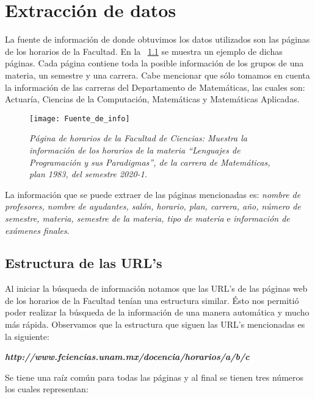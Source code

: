 \chapter{Extracción de datos}

La fuente de información de donde obtuvimos los datos utilizados son las páginas de los horarios de la Facultad. En la \figurename{~\ref{pagFC}} se muestra un ejemplo de dichas páginas. Cada página contiene toda la posible información de los grupos de una materia, un semestre y una carrera. Cabe mencionar que sólo tomamos en cuenta la información de las carreras del Departamento de Matemáticas, las cuales son: Actuaría, Ciencias de la Computación, Matemáticas y Matemáticas Aplicadas.

\begin{figure}[H]
\centering
\texttt{[image: Fuente\_de\_info]} %
\caption[\textit{Página de horarios de la Facultad de Ciencias}]{\textit{Página de horarios de la Facultad de Ciencias: Muestra la información de los horarios de la materia ``Lenguajes de Programación y sus Paradigmas'', de la carrera de Matemáticas, plan 1983, del semestre 2020-1.}}\label{pagFC}
\end{figure}

La información que se puede extraer de las páginas mencionadas es: \textit{nombre de profesores, nombre de ayudantes, salón, horario, plan, carrera, año, número de semestre, materia, semestre de la materia, tipo de materia} e \textit{información de exámenes finales}.


\section{Estructura de las URL's}

Al iniciar la búsqueda de información notamos que las URL's de las páginas web de los horarios de la Facultad tenían una estructura similar. Ésto nos permitió poder realizar la búsqueda de la información de una manera automática y mucho más rápida. Observamos que la estructura que siguen las URL's mencionadas es la siguiente:

\begin{center}
\textit{\textbf{http://www.fciencias.unam.mx/docencia/horarios/a/b/c}}
\end{center}

Se tiene una raíz común para todas las páginas y al final se tienen tres números los cuales representan:

